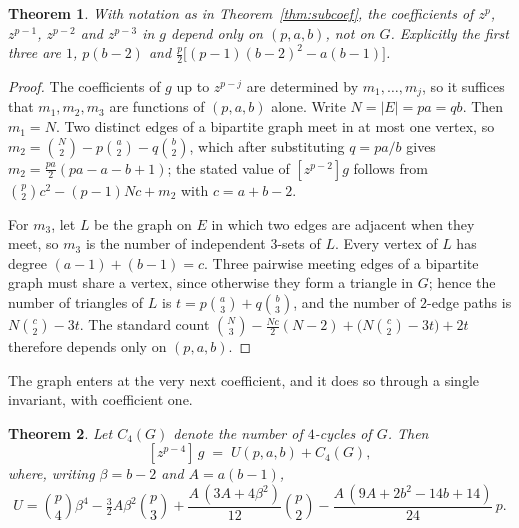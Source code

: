 \documentclass[11pt]{article}
\newtheorem{theorem}{Theorem}
\theoremstyle{remark}
\begin{document}
\begin{theorem}\label{thm:universal}
With notation as in Theorem~\ref{thm:subcoef}, the coefficients of $z^{p}$,
$z^{p-1}$, $z^{p-2}$ and $z^{p-3}$ in $g$ depend only on $(p,a,b)$, not on $G$.
Explicitly the first three are $1$, $p(b-2)$ and
$\tfrac{p}{2}\bigl[(p-1)(b-2)^2-a(b-1)\bigr]$.
\end{theorem}

\begin{proof}
The coefficients of $g$ up to $z^{p-j}$ are determined by $m_1,\dots,m_j$, so it
suffices that $m_1,m_2,m_3$ are functions of $(p,a,b)$ alone. Write $N=|E|=pa=qb$.
Then $m_1=N$. Two distinct edges of a bipartite graph meet in at most one vertex,
so $m_2=\binom N2-p\binom a2-q\binom b2$, which after substituting $q=pa/b$ gives
$m_2=\tfrac{pa}{2}(pa-a-b+1)$; the stated value of $[z^{p-2}]g$ follows from
$\binom p2c^2-(p-1)Nc+m_2$ with $c=a+b-2$.

For $m_3$, let $L$ be the graph on $E$ in which two edges are adjacent when they
meet, so $m_3$ is the number of independent $3$-sets of $L$. Every vertex of $L$
has degree $(a-1)+(b-1)=c$. Three pairwise meeting edges of a bipartite graph
must share a vertex, since otherwise they form a triangle in $G$; hence the
number of triangles of $L$ is $t=p\binom a3+q\binom b3$, and the number of
$2$-edge paths is $N\binom c2-3t$. The standard count
$\binom N3-\tfrac{Nc}{2}(N-2)+\bigl(N\binom c2-3t\bigr)+2t$ therefore depends
only on $(p,a,b)$.
\end{proof}

The graph enters at the very next coefficient, and it does so through a single
invariant, with coefficient one.

\begin{theorem}\label{thm:c4}
Let $C_4(G)$ denote the number of $4$-cycles of $G$. Then
\[
[z^{p-4}]\,g \;=\; U(p,a,b)+C_4(G),
\]
where, writing $\beta=b-2$ and $A=a(b-1)$,
\[
U=\binom p4\beta^4-\tfrac32A\beta^2\binom p3
+\frac{A\,(3A+4\beta^2)}{12}\binom p2-\frac{A\,(9A+2b^2-14b+14)}{24}\,p .
\]
\end{theorem}
\end{document}
